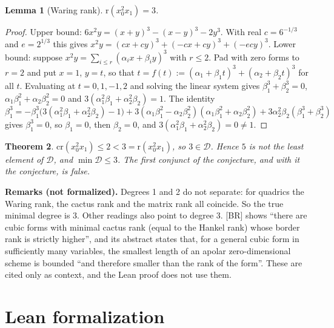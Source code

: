\documentclass[11pt]{article}
\newtheorem{theorem}{Theorem}
\newtheorem{lemma}[theorem]{Lemma}
\theoremstyle{definition}
\begin{document}
\begin{lemma}[Waring rank]
$\mathrm r(x_0^2x_1)=3$.
\end{lemma}
\begin{proof}
Upper bound: $6x^2y=(x+y)^3-(x-y)^3-2y^3$. With real $c=6^{-1/3}$ and $e=2^{1/3}$ this gives
$x^2y=(cx+cy)^3+(-cx+cy)^3+(-ecy)^3$. Lower bound: suppose $x^2y=\sum_{i\le r}(\alpha_ix+\beta_iy)^3$
with $r\le2$. Pad with zero forms to $r=2$ and put $x=1$, $y=t$, so that
$t=f(t):=(\alpha_1+\beta_1t)^3+(\alpha_2+\beta_2t)^3$ for all $t$. Evaluating at
$t=0,1,-1,2$ and solving the linear system gives $\beta_1^3+\beta_2^3=0$,
$\alpha_1\beta_1^2+\alpha_2\beta_2^2=0$ and $3(\alpha_1^2\beta_1+\alpha_2^2\beta_2)=1$. The identity
\[
\beta_1^3=-\beta_1^3\bigl(3(\alpha_1^2\beta_1+\alpha_2^2\beta_2)-1\bigr)
+3(\alpha_1\beta_1^2-\alpha_2\beta_2^2)(\alpha_1\beta_1^2+\alpha_2\beta_2^2)
+3\alpha_2^2\beta_2(\beta_1^3+\beta_2^3)
\]
gives $\beta_1^3=0$, so $\beta_1=0$, then $\beta_2=0$, and $3(\alpha_1^2\beta_1+\alpha_2^2\beta_2)=0\ne1$.
\end{proof}

\begin{theorem}
$\mathrm{cr}(x_0^2x_1)\le2<3=\mathrm r(x_0^2x_1)$, so $3\in\mathcal D$. Hence $5$ is not the least
element of $\mathcal D$, and $\min\mathcal D\le3$. The first conjunct of the conjecture, and with
it the conjecture, is false.
\end{theorem}

\textbf{Remarks (not formalized).} Degrees 1 and 2 do not separate: for quadrics the Waring rank,
the cactus rank and the matrix rank all coincide. So the true minimal degree is 3. Other readings
also point to degree 3. [BR] shows ``there are cubic forms with minimal cactus rank (equal to the
Hankel rank) whose border rank is strictly higher'', and its abstract states that, for a general
cubic form in sufficiently many variables, the smallest length of an apolar zero-dimensional scheme
is bounded ``and therefore smaller than the rank of the form''. These are cited only as context,
and the Lean proof does not use them.

\section{Lean formalization}
\end{document}
